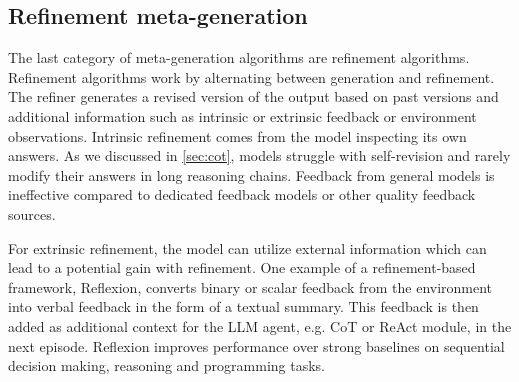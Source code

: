 \subsection{Refinement meta-generation} \label{sec:refine}
The last category of meta-generation algorithms are refinement algorithms. Refinement algorithms work by alternating between generation and refinement.
The refiner generates a revised version of the output based on past versions and additional information such as intrinsic or extrinsic feedback or environment observations\cite{welleck2024decodingmetagenerationinferencetimealgorithms}. 
Intrinsic refinement comes from the model inspecting its own answers. As we discussed in \ref{sec:cot}, models struggle with self-revision and rarely modify their answers in long reasoning chains.
Feedback from general models is ineffective compared to dedicated feedback models or other quality feedback sources\cite{wang2025dedicatedfeedbackeditmodels}. 

For extrinsic refinement, the model can utilize external information which can lead to a potential gain with refinement\cite{welleck2024decodingmetagenerationinferencetimealgorithms}.
One example of a refinement-based framework, Reflexion\cite{shinn2023reflexionlanguageagentsverbal}, converts binary or scalar feedback from the environment into verbal feedback in the form 
of a textual summary. This feedback is then added as additional context for the LLM agent, e.g. CoT or ReAct module, in the next episode. 
Reflexion improves performance over strong baselines on sequential decision making, reasoning and programming tasks\cite{shinn2023reflexionlanguageagentsverbal}.

